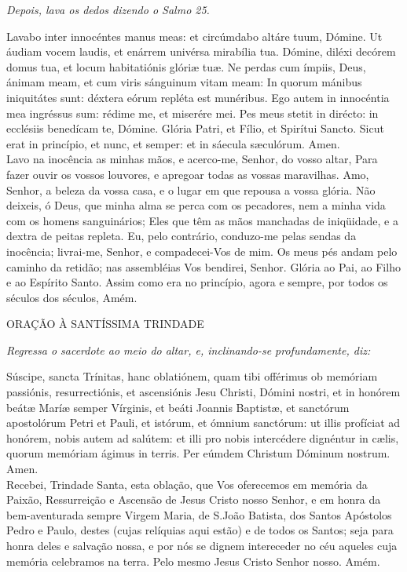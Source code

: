\begin{flushleft}
	\textit{Depois, lava os dedos dizendo o Salmo 25.}
\end{flushleft}


\begin{multicols}{2}
	\noindent Lavabo inter innocéntes manus meas: et circúmdabo altáre tuum, Dómine. 
	Ut áudiam vocem laudis, et enárrem univérsa mirabília tua. 
	Dómine, diléxi decórem domus tua, et locum habitatiónis glóriæ tuæ.
	Ne perdas cum ímpiis, Deus, ánimam meam, et cum viris sánguinum vitam meam: 
	In quorum mánibus iniquitátes sunt: déxtera eórum repléta est munéribus. 
	Ego autem in innocéntia mea ingréssus sum: rédime me, et miserére mei. 
	Pes meus stetit in dirécto: in ecclésiis benedícam te, Dómine. 
	Glória Patri, et Fílio, et Spirítui Sancto. Sicut erat in princípio, et nunc, et semper: et in sáecula sæculórum. Amen. 
	\\ Lavo na inocência as minhas mãos, e acerco-me, Senhor, do vosso altar,
	Para fazer ouvir os vossos louvores, e apregoar todas as vossas maravilhas.
	Amo, Senhor, a beleza da vossa casa, e o lugar em que repousa a vossa glória.
	Não deixeis, ó Deus, que minha alma se perca com os pecadores, nem a minha vida com os homens sanguinários;
	Eles que têm as mãos manchadas de iniqüidade, e a dextra de peitas repleta.
	Eu, pelo contrário, conduzo-me pelas sendas da inocência; livrai-me, Senhor, e compadecei-Vos de mim.
	Os meus pés andam pelo caminho da retidão; nas assembléias Vos bendirei, Senhor.
	Glória ao Pai, ao Filho e ao Espírito Santo. Assim como era no princípio, agora e sempre, por todos os séculos dos séculos, Amém.
\end{multicols}

\begin{center}
	\MakeUppercase{Oração à Santíssima Trindade} 
\end{center}
\textit{Regressa o sacerdote ao meio do altar, e, inclinando-se profundamente, diz:}
\begin{multicols}{2}
	\noindent Súscipe, sancta Trínitas, hanc oblatiónem, quam tibi offérimus ob memóriam passiónis, resurrectiónis, et ascensiónis Jesu Christi, Dómini nostri, et in honórem beátæ Maríæ semper Vírginis, et beáti Joannis Baptistæ, et sanctórum apostolórum Petri et Pauli, et istórum, et ómnium sanctórum: ut illis profíciat ad honórem, nobis autem ad salútem: et illi pro nobis intercédere dignéntur in cælis, quorum memóriam ágimus in terris. Per eúmdem Christum Dóminum nostrum. Amen. 
    \\ Recebei, Trindade Santa, esta oblação, que Vos oferecemos em memória da Paixão, Ressurreição e Ascensão de Jesus Cristo nosso Senhor, e em honra da bem-aventurada sempre Virgem Maria, de S.João Batista, dos Santos Apóstolos Pedro e Paulo, destes (cujas relíquias aqui estão) e de todos os Santos; seja para honra deles e salvação nossa, e por nós se dignem intereceder no céu aqueles cuja memória celebramos na terra. Pelo mesmo Jesus Cristo Senhor nosso. Amém.
\end{multicols}

